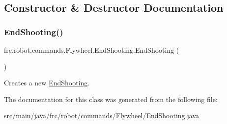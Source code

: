 \subsection{Constructor \& Destructor Documentation}
\mbox{\label{classfrc_1_1robot_1_1commands_1_1_flywheel_1_1_end_shooting_a4a77b898b754ea3f333051eb7a982f11}} 
\subsubsection{\texorpdfstring{EndShooting()}{EndShooting()}}
{\footnotesize\ttfamily frc.\+robot.\+commands.\+Flywheel.\+End\+Shooting.\+End\+Shooting (\begin{DoxyParamCaption}{ }\end{DoxyParamCaption})\hspace{0.3cm}{\ttfamily [inline]}}

Creates a new \mbox{\hyperlink{classfrc_1_1robot_1_1commands_1_1_flywheel_1_1_end_shooting}{End\+Shooting}}. 

The documentation for this class was generated from the following file\+:\begin{DoxyCompactItemize}
\item 
src/main/java/frc/robot/commands/\+Flywheel/End\+Shooting.\+java\end{DoxyCompactItemize}

